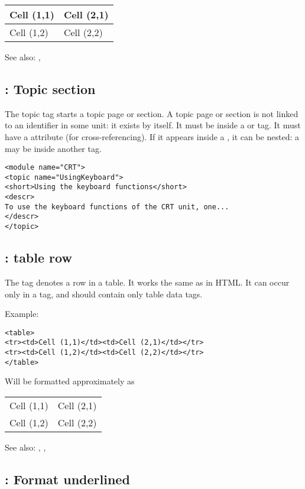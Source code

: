 \begin{tabular}{ll}
Cell (1,1) & Cell (2,1) \\ \hline
Cell (1,2) & Cell (2,2)
\end{tabular}
 
See also: , 

\subsection{ : Topic section}
\label{tag:topic}
The topic tag starts a topic page or section. A topic page or section is
not linked to an identifier in some unit: it exists by itself. It must be 
inside a  or  tag. It must have a 
attribute (for cross-referencing). If it appears inside a , 
it can be nested: a  may be inside another  tag.

\begin{verbatim}
<module name="CRT">
<topic name="UsingKeyboard">
<short>Using the keyboard functions</short>
<descr>
To use the keyboard functions of the CRT unit, one...
</descr>
</topic>
\end{verbatim}

\subsection{ : table row}
\label{tag:tr}
The  tag denotes a row in a table. It works the same as in HTML.
It can occur only in a  tag, and should contain only 
table data tags. 

Example:
\begin{verbatim}
<table>
<tr><td>Cell (1,1)</td><td>Cell (2,1)</td></tr>
<tr><td>Cell (1,2)</td><td>Cell (2,2)</td></tr>
</table>
\end{verbatim}
Will be formatted approximately as

\begin{tabular}{ll}
Cell (1,1) & Cell (2,1) \\
Cell (1,2) & Cell (2,2)
\end{tabular}

See also: , , 

\subsection{ : Format underlined}
\label{tag:u}


